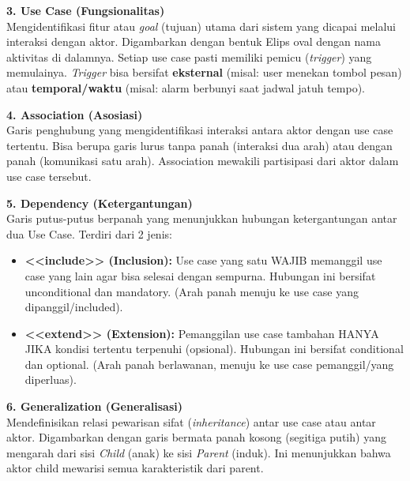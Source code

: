 \documentclass[12pt,a4paper]{article}
\begin{document}
\textbf{3. Use Case (Fungsionalitas)}\\
Mengidentifikasi fitur atau \textit{goal} (tujuan) utama dari sistem yang dicapai melalui interaksi dengan aktor. Digambarkan dengan bentuk Elips oval dengan nama aktivitas di dalamnya. Setiap use case pasti memiliki pemicu (\textit{trigger}) yang memulainya. \textit{Trigger} bisa bersifat \textbf{eksternal} (misal: user menekan tombol pesan) atau \textbf{temporal/waktu} (misal: alarm berbunyi saat jadwal jatuh tempo).

\textbf{4. Association (Asosiasi)}\\
Garis penghubung yang mengidentifikasi interaksi antara aktor dengan use case tertentu. Bisa berupa garis lurus tanpa panah (interaksi dua arah) atau dengan panah (komunikasi satu arah). Association mewakili partisipasi dari aktor dalam use case tersebut.

\textbf{5. Dependency (Ketergantungan)}\\
Garis putus-putus berpanah yang menunjukkan hubungan ketergantungan antar dua Use Case. Terdiri dari 2 jenis:
\begin{itemize}
    \item \textbf{<<include>> (Inclusion):} Use case yang satu WAJIB memanggil use case yang lain agar bisa selesai dengan sempurna. Hubungan ini bersifat unconditional dan mandatory. (Arah panah menuju ke use case yang dipanggil/included).
    \item \textbf{<<extend>> (Extension):} Pemanggilan use case tambahan HANYA JIKA kondisi tertentu terpenuhi (opsional). Hubungan ini bersifat conditional dan optional. (Arah panah berlawanan, menuju ke use case pemanggil/yang diperluas).
\end{itemize}

\textbf{6. Generalization (Generalisasi)}\\
Mendefinisikan relasi pewarisan sifat (\textit{inheritance}) antar use case atau antar aktor. Digambarkan dengan garis bermata panah kosong (segitiga putih) yang mengarah dari sisi \textit{Child} (anak) ke sisi \textit{Parent} (induk). Ini menunjukkan bahwa aktor child mewarisi semua karakteristik dari parent.
\end{document}

